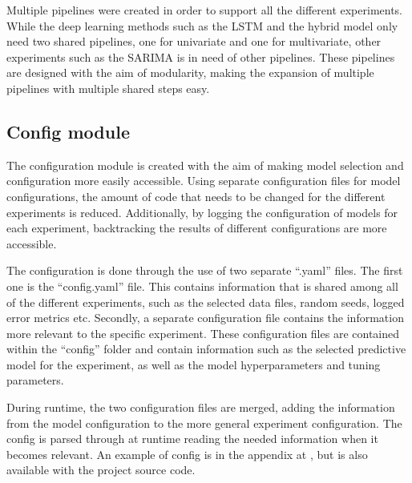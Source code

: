 

Multiple pipelines were created in order to support all the different experiments.
While the deep learning methods such as the LSTM and the hybrid model only need two shared pipelines,
one for univariate and one for multivariate,
other experiments such as the SARIMA is in need of other pipelines.
These pipelines are designed with the aim of modularity,
making the expansion of multiple pipelines with multiple shared steps easy.




\subsection{Config module}
The configuration module is created with the aim of making model selection and configuration more easily accessible.
Using separate configuration files for model configurations,
the amount of code that needs to be changed for the different experiments is reduced.
Additionally, by logging the configuration of models for each experiment,
backtracking the results of different configurations are more accessible.

The configuration is done through the use of two separate ``.yaml'' files.
The first one is the ``config.yaml'' file.
This contains information that is shared among all of the different experiments,
such as the selected data files, random seeds, logged error metrics etc.
Secondly, a separate configuration file contains the information more relevant to the specific experiment.
These configuration files are contained within the ``config'' folder
and contain information such as the selected predictive model for the experiment,
as well as the model hyperparameters and tuning parameters.

During runtime, the two configuration files are merged, adding the information from the model configuration to the more general experiment configuration.
The config is parsed through at runtime reading the needed information when it becomes relevant.
An example of config is in the appendix at , but is also available with the project source code.


